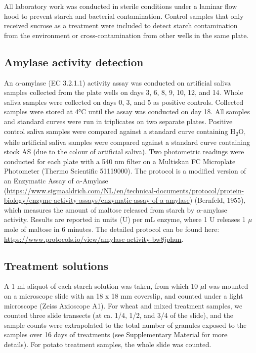 \documentclass[utf8]{frontiers/frontiersSCNS}
\begin{document}
All laboratory work was conducted in sterile conditions under a laminar flow hood
to prevent starch and bacterial contamination. Control samples that only received
sucrose as a treatment were included to detect starch contamination from the
environment or cross-contamination from other wells in the same plate.

\hypertarget{amylase-activity-detection}{%
\subsection{Amylase activity detection}\label{amylase-activity-detection}}

An \(\alpha\)-amylase (EC 3.2.1.1) activity assay was conducted on artificial
saliva samples collected from the plate wells on days 3, 6, 8, 9, 10, 12, and 14.
Whole saliva samples were collected on days 0, 3, and 5 as positive controls.
Collected samples were stored at 4°C until the assay was conducted on day 18.
All samples and standard curves were run in triplicates on two separate plates.
Positive control saliva samples were compared against a standard curve containing
H\textsubscript{2}O, while artificial saliva samples were compared against a standard curve
containing stock AS (due to the colour of artificial saliva).
Two photometric readings were conducted for each plate with a 540 nm filter on a
Multiskan FC Microplate Photometer (Thermo Scientific 51119000).
The protocol is a modified version of an Enzymatic Assay of \(\alpha\)-Amylase
(\url{https://www.sigmaaldrich.com/NL/en/technical-documents/protocol/protein-biology/enzyme-activity-assays/enzymatic-assay-of-a-amylase}) (Bernfeld, 1955), which measures the amount of
maltose released from starch by \(\alpha\)-amylase activity. Results are reported
in units (U) per mL enzyme, where 1 U releases 1 \(\mu\)mole of maltose in 6 minutes.
The detailed protocol can be found here: \url{https://www.protocols.io/view/amylase-activity-bw8jphun}.

\hypertarget{treatment-solutions}{%
\subsection{Treatment solutions}\label{treatment-solutions}}

A 1 ml aliquot of each starch solution was taken, from which 10 \(\mu\)l was mounted
on a microscope slide with an 18 x 18 mm coverslip, and counted under a light microscope
(Zeiss Axioscope A1). For wheat and mixed treatment samples, we counted three
slide transects (at ca. 1/4, 1/2, and 3/4 of the slide), and the sample counts
were extrapolated to the total number of granules exposed to the samples over 16
days of treatments (see Supplementary Material for more details). For potato
treatment samples, the whole slide was counted.
\end{document}

